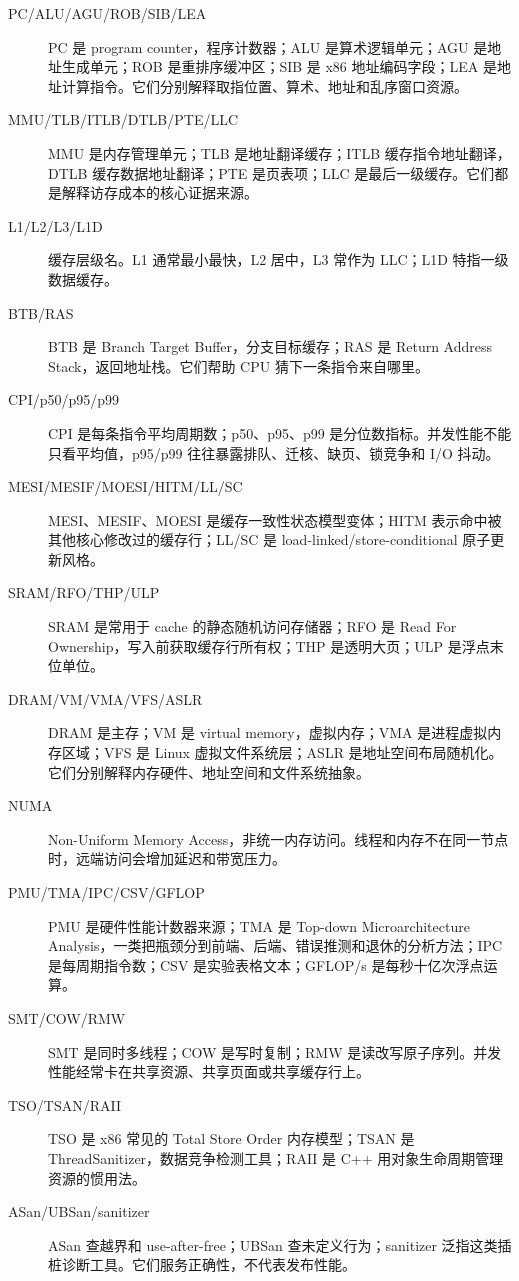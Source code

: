 \begin{description}
  \item[PC/ALU/AGU/ROB/SIB/LEA] PC 是 program counter，程序计数器；ALU 是算术逻辑单元；AGU 是地址生成单元；ROB 是重排序缓冲区；SIB 是 x86 地址编码字段；LEA 是地址计算指令。它们分别解释取指位置、算术、地址和乱序窗口资源。
  \item[MMU/TLB/ITLB/DTLB/PTE/LLC] MMU 是内存管理单元；TLB 是地址翻译缓存；ITLB 缓存指令地址翻译，DTLB 缓存数据地址翻译；PTE 是页表项；LLC 是最后一级缓存。它们都是解释访存成本的核心证据来源。
  \item[L1/L2/L3/L1D] 缓存层级名。L1 通常最小最快，L2 居中，L3 常作为 LLC；L1D 特指一级数据缓存。
  \item[BTB/RAS] BTB 是 Branch Target Buffer，分支目标缓存；RAS 是 Return Address Stack，返回地址栈。它们帮助 CPU 猜下一条指令来自哪里。
  \item[CPI/p50/p95/p99] CPI 是每条指令平均周期数；p50、p95、p99 是分位数指标。并发性能不能只看平均值，p95/p99 往往暴露排队、迁核、缺页、锁竞争和 I/O 抖动。
  \item[MESI/MESIF/MOESI/HITM/LL/SC] MESI、MESIF、MOESI 是缓存一致性状态模型变体；HITM 表示命中被其他核心修改过的缓存行；LL/SC 是 load-linked/store-conditional 原子更新风格。
  \item[SRAM/RFO/THP/ULP] SRAM 是常用于 cache 的静态随机访问存储器；RFO 是 Read For Ownership，写入前获取缓存行所有权；THP 是透明大页；ULP 是浮点末位单位。
  \item[DRAM/VM/VMA/VFS/ASLR] DRAM 是主存；VM 是 virtual memory，虚拟内存；VMA 是进程虚拟内存区域；VFS 是 Linux 虚拟文件系统层；ASLR 是地址空间布局随机化。它们分别解释内存硬件、地址空间和文件系统抽象。
  \item[NUMA] Non-Uniform Memory Access，非统一内存访问。线程和内存不在同一节点时，远端访问会增加延迟和带宽压力。
  \item[PMU/TMA/IPC/CSV/GFLOP] PMU 是硬件性能计数器来源；TMA 是 Top-down Microarchitecture Analysis，一类把瓶颈分到前端、后端、错误推测和退休的分析方法；IPC 是每周期指令数；CSV 是实验表格文本；GFLOP/s 是每秒十亿次浮点运算。
  \item[SMT/COW/RMW] SMT 是同时多线程；COW 是写时复制；RMW 是读改写原子序列。并发性能经常卡在共享资源、共享页面或共享缓存行上。
  \item[TSO/TSAN/RAII] TSO 是 x86 常见的 Total Store Order 内存模型；TSAN 是 ThreadSanitizer，数据竞争检测工具；RAII 是 C++ 用对象生命周期管理资源的惯用法。
  \item[ASan/UBSan/sanitizer] ASan 查越界和 use-after-free；UBSan 查未定义行为；sanitizer 泛指这类插桩诊断工具。它们服务正确性，不代表发布性能。

\end{description}
